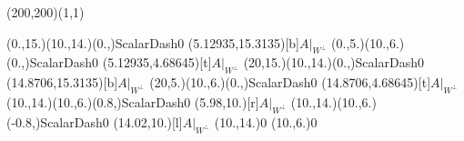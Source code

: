 \unitlength=1bp%

\begin{feynartspicture}(200,200)(1,1)

\FADiagram{}
\FAProp(0.,15.)(10.,14.)(0.,){ScalarDash}{0}
\FALabel(5.12935,15.3135)[b]{$A|_{W^\perp}$}
\FAProp(0.,5.)(10.,6.)(0.,){ScalarDash}{0}
\FALabel(5.12935,4.68645)[t]{$A|_{W^\perp}$}
\FAProp(20,15.)(10.,14.)(0.,){ScalarDash}{0}
\FALabel(14.8706,15.3135)[b]{$A|_{W^\perp}$}
\FAProp(20,5.)(10.,6.)(0.,){ScalarDash}{0}
\FALabel(14.8706,4.68645)[t]{$A|_{W^\perp}$}
\FAProp(10.,14.)(10.,6.)(0.8,){ScalarDash}{0}
\FALabel(5.98,10.)[r]{$A|_{W^\perp}$}
\FAProp(10.,14.)(10.,6.)(-0.8,){ScalarDash}{0}
\FALabel(14.02,10.)[l]{$A|_{W^\perp}$}
\FAVert(10.,14.){0}
\FAVert(10.,6.){0}
\end{feynartspicture}

